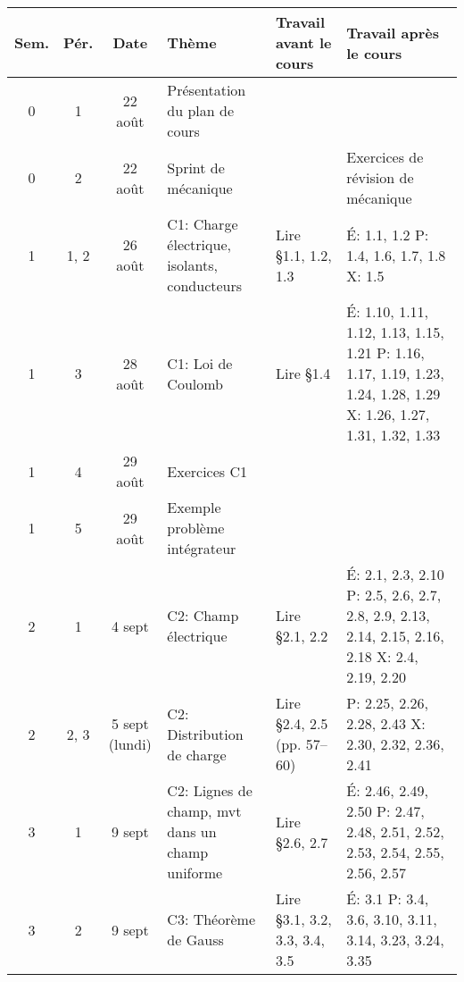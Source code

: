 \documentclass[10pt]{article}
\begin{document}
\sffamily
\renewcommand{\arraystretch}{1.2}
\begin{longtable}{cccp{6cm}lp{9cm}}
  \toprule
  \textbf{Sem.}  &  \textbf{Pér.}  &  \textbf{Date}  &  \textbf{Thème}
    &  \textbf{Travail avant le cours}
    &  \textbf{Travail après le cours}  \\
  \midrule
  \endhead
  0     &  1     &  22 août  &  Présentation du plan de cours
    &  &  \\
  0     &  2     &  22 août  &  Sprint de mécanique
    &  &  Exercices de révision de mécanique  \\
  \midrule
  1     &  1, 2  &  26 août     &  C1: Charge électrique, isolants, conducteurs
    & Lire \S 1.1, 1.2, 1.3
    & É: 1.1, 1.2 \newline 
      P: 1.4, 1.6, 1.7, 1.8 \newline 
      X: 1.5  \\
  1     &  3     &  28 août     &  C1: Loi de Coulomb
    & Lire \S 1.4
    & É: 1.10, 1.11, 1.12, 1.13, 1.15, 1.21 \newline
      P: 1.16, 1.17, 1.19, 1.23, 1.24, 1.28, 1.29 \newline 
      X: 1.26, 1.27, 1.31, 1.32, 1.33 \\
  1     &  4     &  29 août  &  Exercices C1
    &   &    \\
  1     &  5     &  29 août   &  Exemple problème intégrateur
    &   &    \\
  \midrule
  2     &  1     &  4 sept          &  C2: Champ électrique
    &  Lire \S 2.1, 2.2
    &  É: 2.1, 2.3, 2.10 \newline 
       P: 2.5, 2.6, 2.7, 2.8, 2.9, 2.13, 2.14, 2.15, 2.16, 2.18  \newline
       X: 2.4, 2.19, 2.20 \\
  2     &  2, 3     &  5 sept (lundi)  &  C2: Distribution de charge
    &  Lire \S 2.4, 2.5 (pp. 57--60)
    &  P: 2.25, 2.26, 2.28, 2.43 \newline
       X: 2.30, 2.32, 2.36, 2.41 \\
  \midrule
  3     &  1  &  9 sept    &  C2: Lignes de champ, mvt dans un champ uniforme
    & Lire \S 2.6, 2.7
    &  É: 2.46, 2.49, 2.50 \newline 
       P: 2.47, 2.48, 2.51, 2.52, 2.53, 2.54, 2.55, 2.56, 2.57 \\
  3     &  2  &  9 sept    &  C3: Théorème de Gauss
    & Lire \S 3.1, 3.2, 3.3, 3.4, 3.5 
    &  É: 3.1 \newline 
       P: 3.4, 3.6, 3.10, 3.11, 3.14, 3.23, 3.24, 3.35 \newline

\end{longtable}
\end{document}
